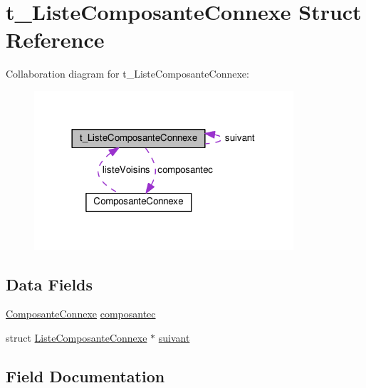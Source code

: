 \hypertarget{structt___liste_composante_connexe}{}\section{t\+\_\+\+Liste\+Composante\+Connexe Struct Reference}
\label{structt___liste_composante_connexe}


Collaboration diagram for t\+\_\+\+Liste\+Composante\+Connexe\+:\nopagebreak
\begin{figure}[H]
\begin{center}
\leavevmode
\includegraphics[width=273pt]{structt___liste_composante_connexe__coll__graph}
\end{center}
\end{figure}
\subsection*{Data Fields}
\begin{DoxyCompactItemize}
\item 
\hyperlink{struct_composante_connexe}{Composante\+Connexe} \hyperlink{structt___liste_composante_connexe_a014090efb1c03d5f1036780b1390bc68}{composantec}
\item 
struct \hyperlink{_liste_composante_connexe_8h_a8002dafd0bddf66157ac8cf6e811e4e7}{Liste\+Composante\+Connexe} $\ast$ \hyperlink{structt___liste_composante_connexe_a1de430f247ea74c5770d3fdfcc58d98a}{suivant}
\end{DoxyCompactItemize}


\subsection{Field Documentation}
